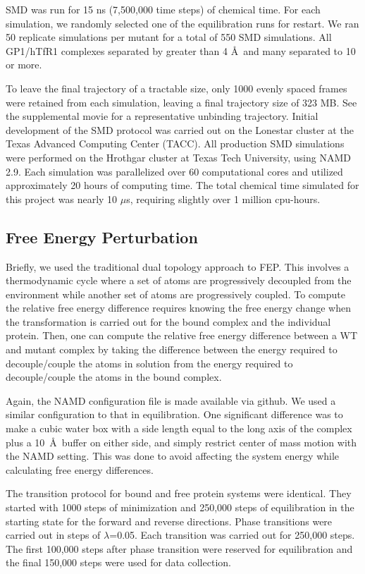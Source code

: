 \documentclass[12pt]{article}
\begin{document}
SMD was run for 15 ns (7,500,000 time steps) of chemical time. For each simulation, we randomly selected one of the equilibration runs for restart. We ran 50 replicate simulations per mutant for a total of 550 SMD simulations. All GP1/hTfR1 complexes separated by greater than 4 \AA\ and many separated to 10 or more.

To leave the final trajectory of a tractable size, only 1000 evenly spaced frames were retained from each simulation, leaving a final trajectory size of 323 MB. See the supplemental movie for a representative unbinding trajectory. Initial development of the SMD protocol was carried out on the Lonestar cluster at the Texas Advanced Computing Center (TACC). All production SMD simulations were performed on the Hrothgar cluster at Texas Tech University, using NAMD 2.9. Each simulation was parallelized over 60 computational cores and utilized approximately 20 hours of computing time. The total chemical time simulated for this project was nearly 10 $\mu$s, requiring slightly over 1 million cpu-hours.

\subsection{Free Energy Perturbation}

Briefly, we used the traditional dual topology approach to FEP. This involves a thermodynamic cycle where a set of atoms are progressively decoupled from the environment while another set of atoms are progressively coupled. To compute the relative free energy difference requires knowing the free energy change when the transformation is carried out for the bound complex and the individual protein. Then, one can compute the relative free energy difference between a WT and mutant complex by taking the difference between the energy required to decouple/couple the atoms in solution from the energy required to decouple/couple the atoms in the bound complex.

Again, the NAMD configuration file is made available via github. We used a similar configuration to that in equilibration. One significant difference was to make a cubic water box with a side length equal to the long axis of the complex plus a 10~\AA\  buffer on either side, and simply restrict center of mass motion with the NAMD setting. This was done to avoid affecting the system energy while calculating free energy differences. 

The transition protocol for bound and free protein systems were identical. They started with 1000 steps of minimization and 250,000 steps of equilibration in the starting state for the forward and reverse directions. Phase transitions were carried out in steps of $\lambda$=0.05. Each transition was carried out for 250,000 steps. The first 100,000 steps after phase transition were reserved for equilibration and the final 150,000 steps were used for data collection.
\end{document}
